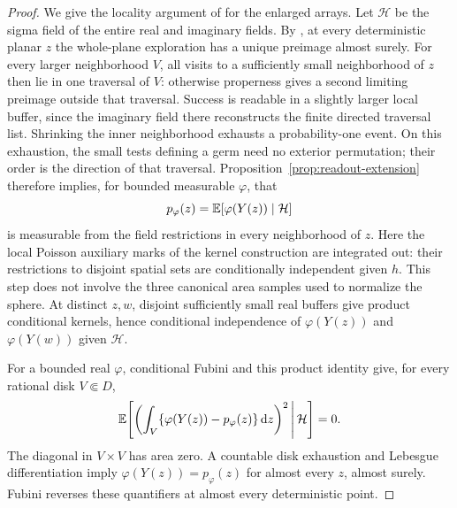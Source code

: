 \begin{proof}
We give the locality argument of \cite[Lemma~8.3]{C} for the enlarged
arrays.  Let \(\mathcal H\) be the sigma field of the entire real and
imaginary fields.  By \cite[Lemma~3.7]{C}, at every deterministic planar
\(z\) the whole-plane exploration has a unique preimage almost surely.
For every larger neighborhood \(V\), all
visits to a sufficiently small neighborhood of \(z\) then lie in one
traversal of \(V\): otherwise properness gives a second limiting
preimage outside that traversal.  Success is readable in a slightly
larger local buffer, since the imaginary field there reconstructs the
finite directed traversal list.  Shrinking the inner neighborhood
exhausts a probability-one event.  On this exhaustion, the small tests
defining a germ need no exterior permutation; their order is the
direction of that traversal.  Proposition~\ref{prop:readout-extension}
therefore implies, for bounded measurable \(\varphi\), that
\begin{equation}
 p_\varphi(z)=\mathbb E[\varphi(Y(z))\mid\mathcal H]
 \label{eq:germ-conditional-mean}
\end{equation}
is measurable from the field restrictions in every neighborhood of
\(z\).  Here the local Poisson auxiliary marks of the kernel construction
are integrated out: their restrictions to disjoint spatial sets are
conditionally independent given \(h\).  This step does not involve the
three canonical area samples used to normalize the sphere.  At distinct
\(z,w\), disjoint sufficiently small real buffers give product
conditional kernels, hence conditional independence of
\(\varphi(Y(z))\) and \(\varphi(Y(w))\) given \(\mathcal H\).

For a bounded real \(\varphi\), conditional Fubini and this product
identity give, for every rational disk \(V\Subset D\),
\begin{equation}
 \mathbb E\!\left[
   \left(\int_V\{\varphi(Y(z))-p_\varphi(z)\}\,\mathrm d z\right)^2
       \,\middle|\,\mathcal H\right]=0 .
 \label{eq:germ-integral}
\end{equation}
The diagonal in \(V\times V\) has area zero.  A countable disk
exhaustion and Lebesgue differentiation imply
\(\varphi(Y(z))=p_\varphi(z)\) for almost every \(z\), almost surely.
Fubini reverses these quantifiers at almost every deterministic point.


\end{proof}
